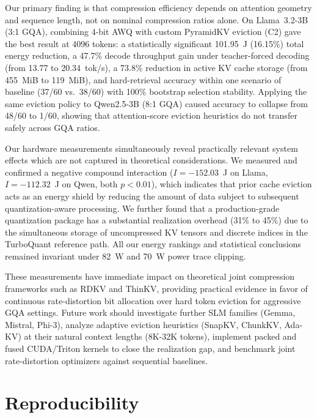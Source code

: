 \documentclass[sigconf,nonacm]{acmart}
\begin{document}
\begin{itemize}
Our primary finding is that compression efficiency depends on attention geometry and sequence length, not on nominal compression ratios alone. On Llama~3.2-3B (3:1 GQA), combining 4-bit AWQ with custom PyramidKV eviction (C2) gave the best result at 4096 tokens: a statistically significant 101.95~J (16.15\%) total energy reduction, a 47.7\% decode throughput gain under teacher-forced decoding (from 13.77 to 20.34~tok/s), a 73.8\% reduction in active KV cache storage (from 455~MiB to 119~MiB), and hard-retrieval accuracy within one scenario of baseline (37/60 vs.\ 38/60) with 100\% bootstrap selection stability. Applying the same eviction policy to Qwen2.5-3B (8:1 GQA) caused accuracy to collapse from 48/60 to 1/60, showing that attention-score eviction heuristics do not transfer safely across GQA ratios.

Our hardware measurements simultaneously reveal practically relevant system effects which are not captured in theoretical considerations. We measured and confirmed a negative compound interaction ($I = -152.03$~J on Llama, $I = -112.32$~J on Qwen, both $p < 0.01$), which indicates that prior cache eviction acts as an energy shield by reducing the amount of data subject to subsequent quantization-aware processing. We further found that a production-grade quantization package has a substantial realization overhead (31\% to 45\%) due to the simultaneous storage of uncompressed KV tensors and discrete indices in the TurboQuant reference path. All our energy rankings and statistical conclusions remained invariant under 82~W and 70~W power trace clipping.

These measurements have immediate impact on theoretical joint compression frameworks such as RDKV and ThinKV, providing practical evidence in favor of continuous rate-distortion bit allocation over hard token eviction for aggressive GQA settings. Future work should investigate further SLM families (Gemma, Mistral, Phi-3), analyze adaptive eviction heuristics (SnapKV, ChunkKV, Ada-KV) at their natural context lengths (8K-32K tokens), implement packed and fused CUDA/Triton kernels to close the realization gap, and benchmark joint rate-distortion optimizers against sequential baselines.


\section{Reproducibility}
\label{sec:reproducibility}


\end{itemize}
\end{document}
